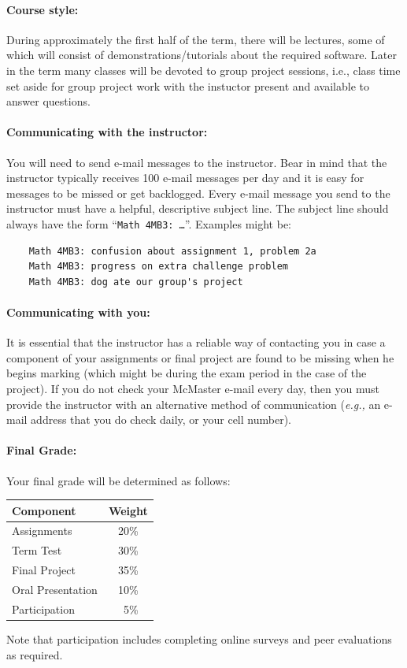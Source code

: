 \documentclass[12pt]{article}
\begin{document}
\paragraph*{Course style:}

During approximately the first half of the term, there will be lectures, some of which will consist of demonstrations/tutorials about the required software.  Later in the term many classes will be devoted to group project sessions, i.e., class time set aside for group project work with the instuctor present and available to answer questions.

\paragraph*{Communicating with the instructor:}

You will need to send e-mail messages to the instructor.  Bear in mind that the instructor typically receives 100 e-mail messages per day and it is easy for messages to be missed or get backlogged.  Every e-mail message you send to the instructor must have a helpful, descriptive subject line.  The subject line should always have the form ``{\tt Math 4MB3: \dots}''.  Examples might be:
\begin{verbatim}
    Math 4MB3: confusion about assignment 1, problem 2a
    Math 4MB3: progress on extra challenge problem
    Math 4MB3: dog ate our group's project
\end{verbatim}

\paragraph*{Communicating with you:}

It is essential that the instructor has a reliable way of contacting you in case a component of your assignments or final project are found to be missing when he begins marking (which might be during the exam period in the case of the project).  If you do not check your McMaster e-mail every day, then you must provide the instructor with an alternative method of communication (\emph{e.g.,} an e-mail address that you do check daily, or your cell number).

\paragraph*{Final Grade:}
Your final grade will be determined as follows:
%
\begin{center}
\begin{tabular}{l|c}
\bf Component & \bf Weight \\\hline
Assignments & 20\% \\
Term Test & 30\% \\
Final Project & 35\% \\
Oral Presentation & 10\% \\
Participation & ~5\% \\
\end{tabular}
\end{center}
\noindent Note that participation includes completing online surveys and peer evaluations as required.
\end{document}
